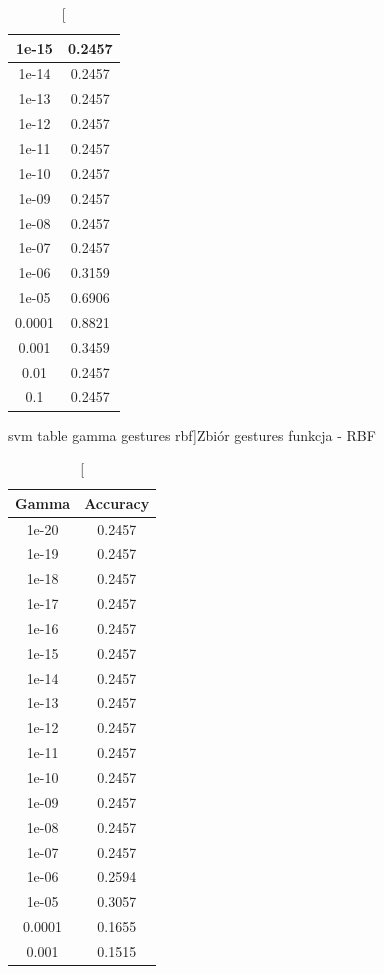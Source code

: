 \documentclass{classrep}
\begin{document}
{{\begin{table}[!htbp]
\begin{minipage}{.3\textwidth}
\begin{tabular}{|c|c|}
1e-15 & 0.2457 \\ \hline
1e-14 & 0.2457 \\ \hline
1e-13 & 0.2457 \\ \hline
1e-12 & 0.2457 \\ \hline
1e-11 & 0.2457 \\ \hline
1e-10 & 0.2457 \\ \hline
1e-09 & 0.2457 \\ \hline
1e-08 & 0.2457 \\ \hline
1e-07 & 0.2457 \\ \hline
1e-06 & 0.3159 \\ \hline
1e-05 & 0.6906 \\ \hline
0.0001 & 0.8821 \\ \hline
0.001 & 0.3459 \\ \hline
0.01 & 0.2457 \\ \hline
0.1 & 0.2457 \\ \hline
        \end{tabular}
        \caption
		[svm table gamma gestures  rbf]{Zbiór gestures  funkcja - RBF}
        \label{svn_table_gamma_gestures _rbf}
    \end{minipage}
    \hfill
    \begin{minipage}{.3\textwidth}
        \centering
        \begin{tabular}{|c|c|}
            \hline
			Gamma & Accuracy \\ \hline
			1e-20 & 0.2457 \\ \hline
1e-19 & 0.2457 \\ \hline
1e-18 & 0.2457 \\ \hline
1e-17 & 0.2457 \\ \hline
1e-16 & 0.2457 \\ \hline
1e-15 & 0.2457 \\ \hline
1e-14 & 0.2457 \\ \hline
1e-13 & 0.2457 \\ \hline
1e-12 & 0.2457 \\ \hline
1e-11 & 0.2457 \\ \hline
1e-10 & 0.2457 \\ \hline
1e-09 & 0.2457 \\ \hline
1e-08 & 0.2457 \\ \hline
1e-07 & 0.2457 \\ \hline
1e-06 & 0.2594 \\ \hline
1e-05 & 0.3057 \\ \hline
0.0001 & 0.1655 \\ \hline
0.001 & 0.1515 \\ \hline

\end{tabular}
\end{minipage}
\end{table}}}
\end{document}
